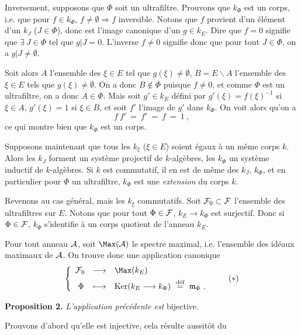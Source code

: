 \noindent Inversement, supposons que $\Phi$ soit un ultrafiltre. Prouvons que $k_\Phi$ est un corps, i.e. que pour $f\in k_\Phi$, $f\neq\emptyset\Longrightarrow f$ inversible. Notons que $f$ provient d'un élément d'un $k_J$ ($J\in\Phi$), donc est l'image canonique d'un $g\in k_E$. Dire que $f=0$ signifie que $\exists\ J\in\Phi$ tel que $g|J=0$. L'inverse $f\neq0$ signifie donc que pour tout $J\in\Phi$, on a $g|J\neq\emptyset$.

\noindent Soit alors $A$ l'ensemble des $\xi\in E$ tel que $g(\xi)\neq\emptyset$, $B=E\backslash A$ l'ensemble des $\xi\in E$ tels que $g(\xi)\neq\emptyset$. On a donc $B\notin\Phi$ puisque $f\neq0$, et comme $\Phi$ est un ultrafiltre, on a donc $A\in\Phi$. Mais soit $g'\in k_E$ défini par $g'(\xi)=f(\xi)^{-1}$ si $\xi\in A$, $g'(\xi)=1$ si $\xi\in B$, et soit $f'$ l'image de $g'$ dans $k_\Phi$. On voit alors qu'on a %
\[
f\ f' \ = \ f' \ = \ f \ = \ 1 \ ,
\]
ce qui montre bien que $k_\Phi$ est un corps.

\noindent Supposons maintenant que tous les $k_\xi$ ($\xi\in E$) soient égaux à un même corps $k$. Alors les $k_J$ forment un système projectif de $k$-algèbres, les $k_\Phi$ un système inductif de $k$-algèbres. Si $k$ est commutatif, il en est de même des $k_J$, $k_\Phi$, et en particulier pour $\Phi$ un ultrafiltre, $k_\Phi$ est une \textit{extension} du corps $k$.

\noindent Revenons au cas général, mais les $k_\xi$ commutatifs. Soit $\mathcal{F}_0\subset\mathcal{F}$ l'ensemble des ultrafiltres sur $E$. Notons que pour tout $\Phi\in\mathcal{F}$, $k_E\longrightarrow k_\Phi$ est surjectif. Donc si $\Phi\in\mathcal{F}$, $k_\Phi$ s'identifie à un corps quotient de l'anneau $k_E$.


\noindent Pour tout anneau $\mathcal{A}$, soit $\Max(\cA)$ le spectre maximal, i.e. l'ensemble des idéaux maximaux de $\mathcal{A}$. On trouve donc une application canonique
\[
\left\{
\begin{array}{lll}
\cF_0 & \longrightarrow & \Max(k_E)\\[1ex]
\ \Phi & \longmapsto & \Ker(k_E\longrightarrow k_\Phi) \ \defeq \ \mathfrak{m}_\Phi \ .
\end{array}\right. \tag*{$(*)$}
\]

\noindent\textbf{Proposition 2.} \textit{L'application précédente est} bijective.

\noindent Prouvons d'abord qu'elle est injective, cela résulte aussitôt du


